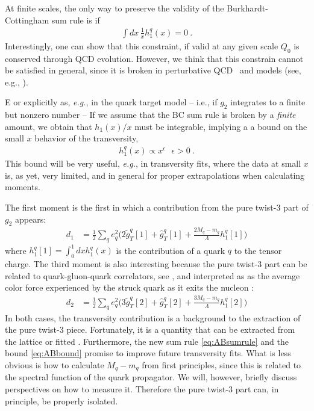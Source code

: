 \documentclass[preprintnumbers,floatfix,nofootinbib]{revtex4}
\newcommand{\eg}{{\em e.g.}}
\begin{document}
At finite scales, the only way to preserve the validity of the
Burkhardt-Cottingham sum rule is if
\begin{align}
   \int dx\, \frac{1}{x} h_1^q(x) = 0 \ .
\label{eq:ABsumrule}
\end{align}
Interestingly, one can show that this constraint, if valid at any given scale
$Q_0$ is conserved through QCD evolution. However, we think that this
constrain cannot be satisfied in general, since it is broken in perturbative
QCD~\cite{Kundu:2001pk} and models (see, e.g., \cite{}).

E or explicitly as, \eg, in the quark
target model \cite{Kundu:2001pk} -- i.e., if $g_2$ integrates to a finite but
nonzero number -- 
If we assume that the BC sum rule is broken by a {\em finite} amount, we
obtain that $h_1(x)/x$ must be integrable, implying a 
a bound on the small $x$ behavior of the transversity, 
\begin{align}
  h_1^q(x) \propto x^\epsilon \ \ \ \epsilon>0 \ .
\label{eq:ABbound}
\end{align}
This bound will be very useful, \eg, in transversity fits, where the data at
small $x$ is, as yet, very limited, and in general for proper extrapolations
when calculating moments. 

The first moment is the first in which a contribution from the pure twist-3 part of $g_2$ appears:
\begin{align}
  d_1 & = \frac12 \sum_q e_q^2 \bigg( 2 \tilde g_T^q[1] + \hat g_T^q[1]
    + \frac{2M_q-m_q}{\Lambda} h_1^q[1] \bigg)
\end{align}
where $h_1^q[1] = \int_0^1 dx h_1^q(x)$ is the contribution of a quark $q$ to the tensor charge. 
The third moment is also interesting because the pure twist-3 part can be related to quark-gluon-quark correlators, see \cite{Jaffe:1996zw}, and interpreted as as the average color force experienced by the struck quark as it exits the nucleon \cite{Burkardt:2012sd}:
\begin{align}
  d_2 & = \frac12 \sum_q e_q^2 \bigg( 3 \tilde g_T^q[2] + \hat g_T^q[2]
    + \frac{3M_q-m_q}{\Lambda} h_1^q[2] \bigg)
\end{align}
In both cases, the transversity contribution is a background to the extraction of the pure twist-3 piece. Fortunately, it is a quantity that can be extracted from the lattice
\cite{Green:2012ej,Bali:2014nma,Bhattacharya:2015wna,Abdel-Rehim:2015owa,Bhattacharya:2016zcn} or fitted
\cite{Radici:2015mwa,Anselmino:2015sxa,Kang:2015msa}.
Furthermore, the new sum rule \eqref{eq:ABsumrule} and the bound \eqref{eq:ABbound} promise to improve future transversity fits. What is less obvious is how to calculate $M_q-m_q$ from first principles, since this is related to the spectral function of the quark propagator. We will, however, briefly discuss perspectives on how to measure it. Therefore the pure twist-3 part can, in principle, be properly isolated.
\end{document}
